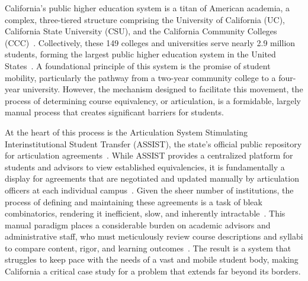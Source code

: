 
\begin{introduction}


    California's public higher education system is a titan of American academia, a complex, three-tiered structure comprising the University of California (UC), California State University (CSU), and the California Community Colleges (CCC)~\cite{ppic}. Collectively, these 149 colleges and universities serve nearly 2.9 million students, forming the largest public higher education system in the United States~\cite{ppic,uc,calstate,cccco}. A foundational principle of this system is the promise of student mobility, particularly the pathway from a two-year community college to a four-year university. However, the mechanism designed to facilitate this movement, the process of determining course equivalency, or articulation, is a formidable, largely manual process that creates significant barriers for students.

    At the heart of this process is the Articulation System Stimulating Interinstitutional Student Transfer (ASSIST), the state's official public repository for articulation agreements~\cite{assistinfo}. While ASSIST provides a centralized platform for students and advisors to view established equivalencies, it is fundamentally a display for agreements that are negotiated and updated manually by articulation officers at each individual campus~\cite{assistfaq}. Given the sheer number of institutions, the process of defining and maintaining these agreements is a task of bleak combinatorics, rendering it inefficient, slow, and inherently intractable~\cite{pardos2019}. This manual paradigm places a considerable burden on academic advisors and administrative staff, who must meticulously review course descriptions and syllabi to compare content, rigor, and learning outcomes~\cite{pardos2019}. The result is a system that struggles to keep pace with the needs of a vast and mobile student body, making California a critical case study for a problem that extends far beyond its borders.


\end{introduction}
